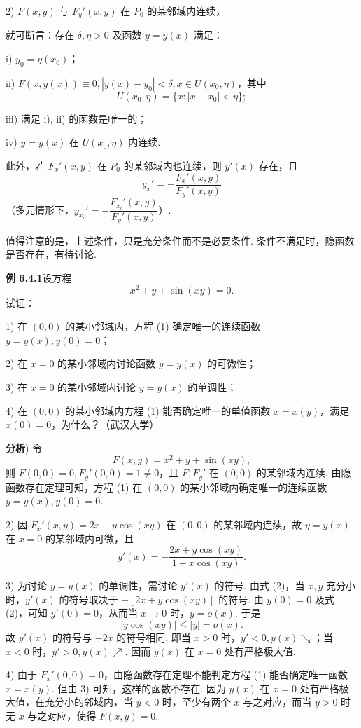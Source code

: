 \documentclass[UTF8, 12pt, fontset=fandol, oneside]{ctexart}
\begin{document}
2) $F(x,y)$ 与 $F_y'(x,y)$ 在 $P_0$ 的某邻域内连续，

\noindent 就可断言：存在 $\delta,\eta>0$ 及函数 $y=y(x)$ 满足：

i) $y_0=y(x_0)$；

ii) $F(x,y(x))\equiv0,|y(x)-y_0|<\delta,x\in U(x_0,\eta)$，其中
\[
  U(x_0,\eta)=\{x:|x-x_0|<\eta\};
\]

iii) 满足 i), ii) 的函数是唯一的；

iv) $y=y(x)$ 在 $U(x_0,\eta)$ 内连续.

此外，若 $F_x'(x,y)$ 在 $P_0$ 的某邻域内也连续，则 $y'(x)$ 存在，且
\[
  y_x'=-\frac{F_x'(x,y)}{F_y'(x,y)}
\]
（多元情形下，$y_{x_i}'=-\dfrac{F_{x_i}'(x,y)}{F_y'(x,y)}$）.

\noindent 值得注意的是，上述条件，只是充分条件而不是必要条件. 条件不满足时，隐函数是否存在，有待讨论.

\noindent\textbf{例 6.4.1}\quad 设方程
\begin{equation}
  x^2+y+\sin(xy)=0.
\end{equation}
试证：

1) 在 $(0,0)$ 的某小邻域内，方程 (1) 确定唯一的连续函数 $y=y(x),y(0)=0$；

2) 在 $x=0$ 的某小邻域内讨论函数 $y=y(x)$ 的可微性；

3) 在 $x=0$ 的某小邻域内讨论 $y=y(x)$ 的单调性；

4) 在 $(0,0)$ 的某小邻域内方程 (1) 能否确定唯一的单值函数 $x=x(y)$，满足 $x(0)=0$，为什么？（武汉大学）

\noindent\textbf{分析}) 令
\[
  F(x,y)=x^2+y+\sin(xy),
\]
则 $F(0,0)=0,F_y'(0,0)=1\ne0$，且 $F,F_y'$ 在 $(0,0)$ 的某邻域内连续. 由隐函数存在定理可知，方程 (1) 在 $(0,0)$ 的某小邻域内确定唯一的连续函数 $y=y(x),y(0)=0$.

2) 因 $F_x'(x,y)=2x+y\cos(xy)$ 在 $(0,0)$ 的某邻域内连续，故 $y=y(x)$ 在 $x=0$ 的某邻域内可微，且
\begin{equation}
  y'(x)=-\frac{2x+y\cos(xy)}{1+x\cos(xy)}.
\end{equation}

3) 为讨论 $y=y(x)$ 的单调性，需讨论 $y'(x)$ 的符号. 由式 (2)，当 $x,y$ 充分小时，$y'(x)$ 的符号取决于 $-[2x+y\cos(xy)]$ 的符号. 由 $y(0)=0$ 及式 (2)，可知 $y'(0)=0$，从而当 $x\to0$ 时，$y=o(x)$. 于是
\[
  |y\cos(xy)|\le |y|=o(x).
\]
故 $y'(x)$ 的符号与 $-2x$ 的符号相同. 即当 $x>0$ 时，$y'<0,y(x)\searrow$；当 $x<0$ 时，$y'>0,y(x)\nearrow$. 因而 $y(x)$ 在 $x=0$ 处有严格极大值.

4) 由于 $F_x'(0,0)=0$，由隐函数存在定理不能判定方程 (1) 能否确定唯一函数 $x=x(y)$. 但由 3) 可知，这样的函数不存在. 因为 $y(x)$ 在 $x=0$ 处有严格极大值，在充分小的邻域内，当 $y<0$ 时，至少有两个 $x$ 与之对应，而当 $y>0$ 时无 $x$ 与之对应，使得 $F(x,y)=0$.
\end{document}

